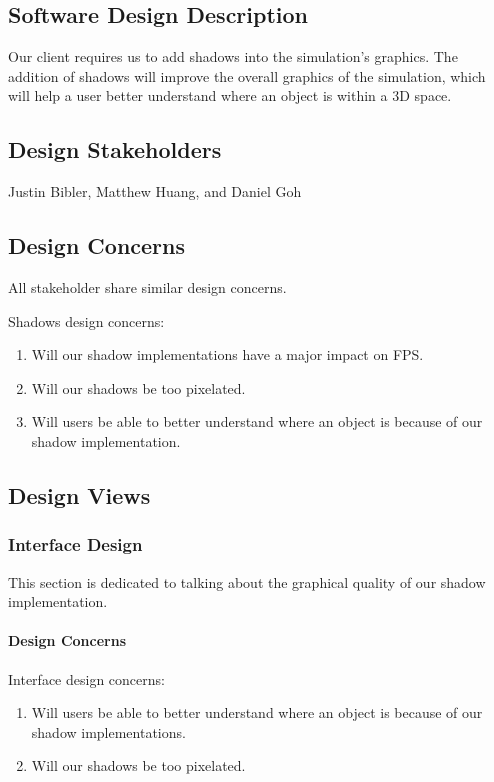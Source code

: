 \documentclass[10pt,journal,compsoc,draftclsnofoot]{IEEEtran}
\begin{document}
\begin{flushleft}
\normalsize
\subsection{Software Design Description}
Our client requires us to add shadows into the simulation's graphics.
The addition of shadows will improve the overall graphics of the simulation, which will help a user better understand where an object is within a 3D space.

\subsection{Design Stakeholders}
Justin Bibler, Matthew Huang, and Daniel Goh

\subsection{Design Concerns}
All stakeholder share similar design concerns.

Shadows design concerns:
\begin{enumerate}
\item Will our shadow implementations have a major impact on FPS.
\item Will our shadows be too pixelated.
\item Will users be able to better understand where an object is because of our shadow implementation.
\end{enumerate}

\newpage

\subsection{Design Views}
\subsubsection{Interface Design}
This section is dedicated to talking about the graphical quality of our shadow implementation.

\paragraph{Design Concerns}
Interface design concerns:
\begin{enumerate}
\item Will users be able to better understand where an object is because of our shadow implementations.
\item Will our shadows be too pixelated.
\end{enumerate}


\end{flushleft}
\end{document}
